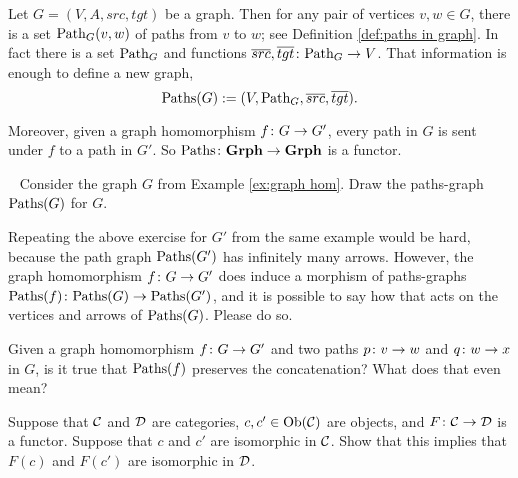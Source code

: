 \documentclass[CT4S-EN-RU]{subfiles}
\begin{document}
\begin{example}\label{ex:paths-graph}

Let $G=(V,A,src,tgt)$ be a graph. Then for any pair of vertices $v,w\in G$, there is a set $\textnormal{Path}_G(v,w)$ of paths from $v$ to $w$; see Definition \ref{def:paths in graph}. In fact there is a set $\textnormal{Path}_G$ and functions $\overline{src},\overline{tgt}\colon\textnormal{Path}_G\rightarrow V$. That information is enough to define a new graph, $$\textnormal{Paths}(G):=(V,\textnormal{Path}_G,\overline{src},\overline{tgt}).$$

Moreover, given a graph homomorphism $f\colon G\rightarrow G'$, every path in $G$ is sent under $f$ to a path in $G'$. So $\textnormal{Paths}\colon{\bf Grph}\rightarrow{\bf Grph}$ is a functor.

\end{example}

\begin{exercise}\label{exc:morphisms on paths-graphs}~
\sexc Consider the graph $G$ from Example \ref{ex:graph hom}. Draw the paths-graph $\textnormal{Paths}(G)$ for $G$. 
\item Repeating the above exercise for $G'$ from the same example would be hard, because the path graph $\textnormal{Paths}(G')$ has infinitely many arrows. However, the graph homomorphism $f\colon G\rightarrow G'$ does induce a morphism of paths-graphs $\textnormal{Paths}(f)\colon\textnormal{Paths}(G)\rightarrow\textnormal{Paths}(G')$, and it is possible to say how that acts on the vertices and arrows of $\textnormal{Paths}(G)$. Please do so.
\item Given a graph homomorphism $f\colon G\rightarrow G'$ and two paths $p\colon v\rightarrow w$ and $q\colon w\rightarrow x$ in $G$, is it true that $\textnormal{Paths}(f)$ preserves the concatenation? What does that even mean?
\endsexc
\end{exercise}

\begin{exercise}\label{exc:functors preserve isos}
Suppose that $\mathcal{C}$ and $\mathcal{D}$ are categories, $c,c'\in\textnormal{Ob}(\mathcal{C})$ are objects, and $F\colon\mathcal{C}\rightarrow\mathcal{D}$ is a functor. Suppose that $c$ and $c'$ are isomorphic in $\mathcal{C}$. Show that this implies that $F(c)$ and $F(c')$ are isomorphic in $\mathcal{D}$.
\end{exercise}
\end{document}
